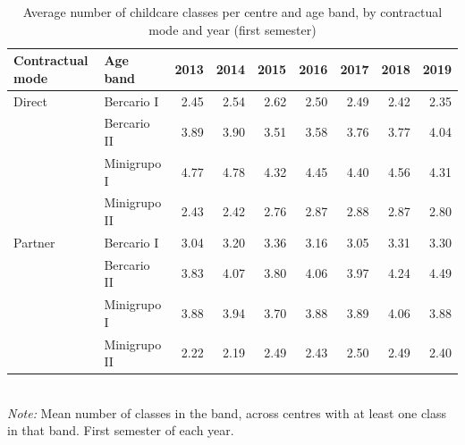 \begin{table}[htbp]\centering
\caption{Average number of childcare classes per centre and age band, by contractual mode and year (first semester)}
\label{tab:T6c_turmas_por_escola}
\small
\setlength{\tabcolsep}{4pt}
\begin{tabular}{llrrrrrrr}
\toprule
Contractual mode & Age band & 2013 & 2014 & 2015 & 2016 & 2017 & 2018 & 2019 \\
\midrule
Direct & Bercario I & 2.45 & 2.54 & 2.62 & 2.50 & 2.49 & 2.42 & 2.35 \\
 & Bercario II & 3.89 & 3.90 & 3.51 & 3.58 & 3.76 & 3.77 & 4.04 \\
 & Minigrupo I & 4.77 & 4.78 & 4.32 & 4.45 & 4.40 & 4.56 & 4.31 \\
 & Minigrupo II & 2.43 & 2.42 & 2.76 & 2.87 & 2.88 & 2.87 & 2.80 \\
Partner & Bercario I & 3.04 & 3.20 & 3.36 & 3.16 & 3.05 & 3.31 & 3.30 \\
 & Bercario II & 3.83 & 4.07 & 3.80 & 4.06 & 3.97 & 4.24 & 4.49 \\
 & Minigrupo I & 3.88 & 3.94 & 3.70 & 3.88 & 3.89 & 4.06 & 3.88 \\
 & Minigrupo II & 2.22 & 2.19 & 2.49 & 2.43 & 2.50 & 2.49 & 2.40 \\
\bottomrule
\end{tabular}
\\[3pt]{\footnotesize \textit{Note:} Mean number of classes in the band, across centres with at least one class in that band. First semester of each year.}
\end{table}
